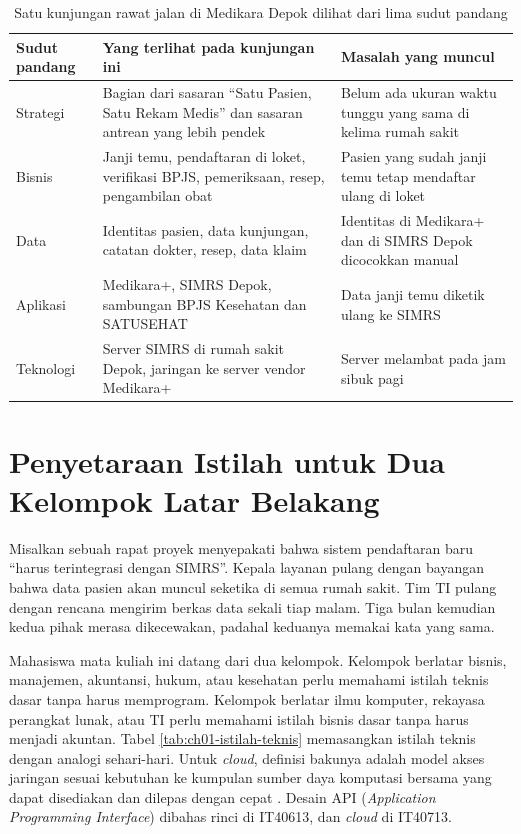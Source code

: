 \begin{table}[!htb]
  \centering
  \caption{Satu kunjungan rawat jalan di Medikara Depok dilihat dari lima sudut pandang}
  \label{tab:ch01-kunjungan}
  \footnotesize
  \begin{tabularx}{\textwidth}{>{\raggedright\arraybackslash}p{1.6cm}
      >{\raggedright\arraybackslash}X >{\raggedright\arraybackslash}X}
    \hline
    \textbf{Sudut pandang} & \textbf{Yang terlihat pada kunjungan ini} & \textbf{Masalah yang muncul} \\
    \hline
    Strategi & Bagian dari sasaran ``Satu Pasien, Satu Rekam Medis'' dan sasaran antrean yang lebih pendek & Belum ada ukuran waktu tunggu yang sama di kelima rumah sakit \\
    \hline
    Bisnis & Janji temu, pendaftaran di loket, verifikasi BPJS, pemeriksaan, resep, pengambilan obat & Pasien yang sudah janji temu tetap mendaftar ulang di loket \\
    \hline
    Data & Identitas pasien, data kunjungan, catatan dokter, resep, data klaim & Identitas di Medikara+ dan di SIMRS Depok dicocokkan manual \\
    \hline
    Aplikasi & Medikara+, SIMRS Depok, sambungan BPJS Kesehatan dan SATUSEHAT & Data janji temu diketik ulang ke SIMRS \\
    \hline
    Teknologi & Server SIMRS di rumah sakit Depok, jaringan ke server vendor Medikara+ & Server melambat pada jam sibuk pagi \\
    \hline
  \end{tabularx}
\end{table}

\section{Penyetaraan Istilah untuk Dua Kelompok Latar Belakang}

Misalkan sebuah rapat proyek menyepakati bahwa sistem pendaftaran baru
``harus terintegrasi dengan SIMRS''. Kepala layanan pulang dengan bayangan
bahwa data pasien akan muncul seketika di semua rumah sakit. Tim TI pulang
dengan rencana mengirim berkas data sekali tiap malam. Tiga bulan kemudian
kedua pihak merasa dikecewakan, padahal keduanya memakai kata yang sama.

Mahasiswa mata kuliah ini datang dari dua kelompok. Kelompok berlatar bisnis,
manajemen, akuntansi, hukum, atau kesehatan perlu memahami istilah teknis
dasar tanpa harus memprogram. Kelompok berlatar ilmu komputer, rekayasa
perangkat lunak, atau TI perlu memahami istilah bisnis dasar tanpa harus
menjadi akuntan. Tabel \ref{tab:ch01-istilah-teknis} memasangkan istilah
teknis dengan analogi sehari-hari. Untuk \textit{cloud}, definisi bakunya
adalah model akses jaringan sesuai kebutuhan ke kumpulan sumber daya
komputasi bersama yang dapat disediakan dan dilepas dengan cepat
\cite{nist800-145}. Desain API (\textit{Application Programming
Interface}) dibahas rinci di IT40613, dan \textit{cloud} di IT40713.

